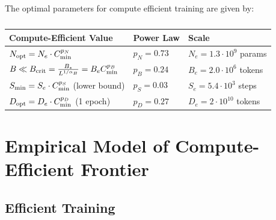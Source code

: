 \documentclass[english]{article}
\begin{document}
The optimal parameters for compute efficient training are given by:

\begin{table}[h!]
\centering
\vspace{-0.5em}
\begin{tabular}{|l|l|l|}
\hline 
\textbf{Compute-Efficient Value} & \textbf{Power Law} & \textbf{Scale}\tabularnewline
\hline 
\hline 
$N_{{\rm opt}}=N_{e}\cdot C_{{\rm min}}^{p_{N}}$ & $p_{N}=0.73$ & $N_{e}=1.3\cdot10^{9}$ params\tabularnewline
\hline 
$B \ll B_{{\rm crit}}=\frac{B_{\ast}}{L^{1/\alpha_{B}}}=B_{e}C_{{\rm min}}^{p_{B}}$ & $p_{B}=0.24$ & $B_{e}=2.0\cdot10^{6}$ tokens\tabularnewline
\hline 
$S_{{\rm min}}=S_{e}\cdot C_{{\rm min}}^{p_{S}}$ (lower bound) & $p_{S}=0.03$ & $S_{e}=5.4\cdot10^{3}$ steps\tabularnewline
\hline 
$D_{{\rm opt}}=D_{e}\cdot C_{{\rm min}}^{p_{D}}$ (1 epoch) & $p_{D}=0.27$ & $D_{e}=2\cdot10^{10}$ tokens\tabularnewline
\hline 
\end{tabular}
\vspace{0.5em}
\caption[Trends for compute-efficient training]{}
\vspace{-1em}
\end{table}





\section{Empirical Model of Compute-Efficient Frontier}
\label{app:ComputeEfficientTraining}

\subsection{Efficient Training}
\end{document}
